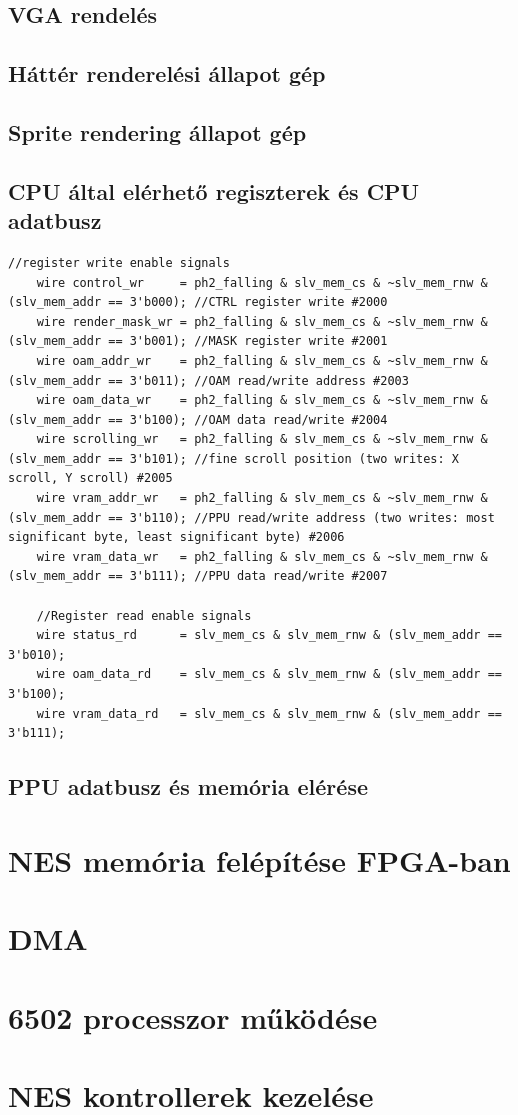	\subsection{VGA rendelés}

	\subsection{Háttér renderelési állapot gép}

	\subsection{Sprite rendering állapot gép}

	\subsection{CPU által elérhető regiszterek és CPU adatbusz}
	
	\begin{lstlisting}[style=prettyverilog]
	//register write enable signals
	wire control_wr     = ph2_falling & slv_mem_cs & ~slv_mem_rnw & (slv_mem_addr == 3'b000); //CTRL register write #2000
	wire render_mask_wr = ph2_falling & slv_mem_cs & ~slv_mem_rnw & (slv_mem_addr == 3'b001); //MASK register write #2001
	wire oam_addr_wr    = ph2_falling & slv_mem_cs & ~slv_mem_rnw & (slv_mem_addr == 3'b011); //OAM read/write address #2003
	wire oam_data_wr    = ph2_falling & slv_mem_cs & ~slv_mem_rnw & (slv_mem_addr == 3'b100); //OAM data read/write #2004
	wire scrolling_wr   = ph2_falling & slv_mem_cs & ~slv_mem_rnw & (slv_mem_addr == 3'b101); //fine scroll position (two writes: X scroll, Y scroll) #2005
	wire vram_addr_wr   = ph2_falling & slv_mem_cs & ~slv_mem_rnw & (slv_mem_addr == 3'b110); //PPU read/write address (two writes: most significant byte, least significant byte) #2006
	wire vram_data_wr   = ph2_falling & slv_mem_cs & ~slv_mem_rnw & (slv_mem_addr == 3'b111); //PPU data read/write #2007
	
	//Register read enable signals
	wire status_rd      = slv_mem_cs & slv_mem_rnw & (slv_mem_addr == 3'b010);
	wire oam_data_rd    = slv_mem_cs & slv_mem_rnw & (slv_mem_addr == 3'b100);
	wire vram_data_rd   = slv_mem_cs & slv_mem_rnw & (slv_mem_addr == 3'b111);\end{lstlisting}
	
	\subsection{PPU adatbusz és memória elérése}

\section{NES memória felépítése FPGA-ban}

\section{DMA}

\section{6502 processzor működése}

\section{NES kontrollerek kezelése}